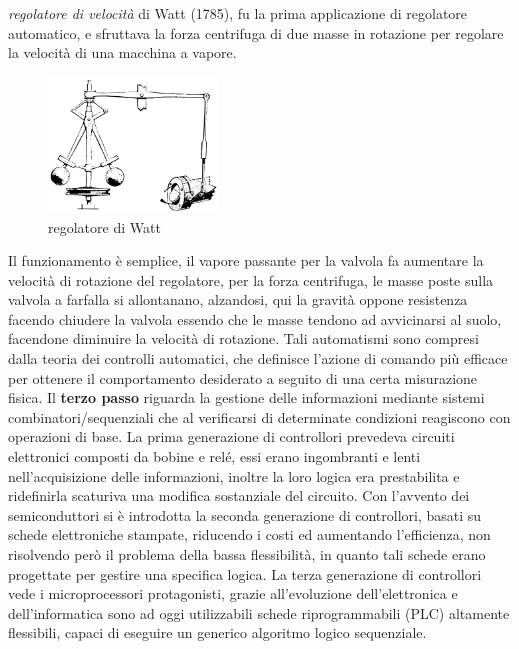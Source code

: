 \documentclass[10pt, letterpaper]{report}
\begin{document}
\textit{regolatore di velocità} di Watt (1785), fu la prima applicazione di regolatore automatico, e sfruttava 
la forza centrifuga di due masse in rotazione per regolare la velocità di una macchina a vapore.
\begin{figure}[h!]
    \centering
    \includegraphics[width=0.4\textwidth ]{images/watt.pdf}
    \caption{regolatore di Watt}
    \label{fig:watt}
\end{figure} \acc
Il funzionamento è semplice, il vapore passante per la valvola fa aumentare la velocità di rotazione del 
regolatore, per la forza centrifuga, le masse poste sulla valvola a farfalla si allontanano, alzandosi, 
qui la gravità oppone resistenza facendo chiudere la valvola essendo che le masse tendono ad avvicinarsi al 
suolo, facendone diminuire la velocità di rotazione.  
Tali automatismi sono compresi dalla teoria dei controlli automatici, che definisce l'azione di comando più efficace 
per ottenere il comportamento desiderato a seguito di una certa misurazione fisica.\acc
Il \textbf{terzo passo} riguarda la gestione delle informazioni mediante sistemi combinatori/sequenziali che al 
verificarsi di determinate condizioni reagiscono con operazioni di base. La prima generazione di controllori 
prevedeva circuiti elettronici composti da bobine e relé, essi erano ingombranti e lenti nell'acquisizione 
delle informazioni, inoltre la loro logica era prestabilita e ridefinirla scaturiva una modifica sostanziale 
del circuito. \acc 
Con l'avvento dei semiconduttori si è introdotta la seconda generazione di controllori, basati su schede 
elettroniche stampate, riducendo i costi ed aumentando l'efficienza, non risolvendo però il problema della bassa 
flessibilità, in quanto tali schede erano progettate per gestire una specifica logica. \acc 
La terza generazione di controllori vede i microprocessori protagonisti, grazie all'evoluzione dell'elettronica 
e dell'informatica sono ad oggi utilizzabili schede riprogrammabili (PLC) altamente flessibili, capaci di eseguire 
un generico algoritmo logico sequenziale.
\end{document}
